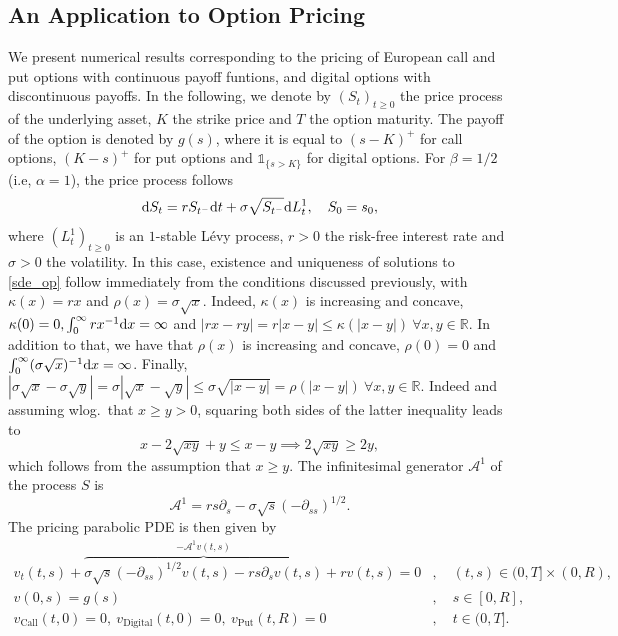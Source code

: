 \subsection{An Application to Option Pricing}
We present numerical results corresponding to the pricing of European call and put options with continuous payoff funtions, and digital options with discontinuous payoffs. In the following, we denote by $(S_t)_{t\ge0}$ the price process of the underlying asset, $K$ the strike price and $T$ the option maturity. The payoff of the option is denoted by $g(s)$, where it is equal to $(s-K)^+$ for call options, $(K-s)^+$ for put options and $\mathbb{1}_{\{s>K\}}$ for digital options. For $\beta = 1/2$ (i.e, $\alpha=1$), the price process follows
\begin{equation} \label{sde_op}
\text{d} S_t = rS_{t^{-}}\text{d} t + \sigma\sqrt{S_{t^{-}}}\text{d} L_t^{1},\quad S_0=s_0, 
\end{equation} 
where $(L_t^{1})_{t\ge 0}$ is an $1$-stable L\'{e}vy process, $r>0$ the risk-free interest rate and $\sigma>0$ the volatility. In this case, existence and uniqueness of solutions to \eqref{sde_op} follow immediately from the conditions discussed previously, with $\kappa(x) = rx$ and $\rho(x) =\sigma \sqrt{x}$. Indeed, $\kappa(x)$ is increasing and concave, $\kappa(0)=0, \int_0^{\infty}rx^{-1}\text{d} x = \infty$ and $|rx-ry| = r|x-y| \le \kappa(|x-y|) \  \forall x,y\in\mathbb{R}.$ In addition to that, we have that $\rho(x)$ is increasing and concave, $\rho(0)=0$ and $\int_0^{\infty}(\sigma\sqrt{x})^{-1}\text{d} x = \infty$. Finally, $|\sigma\sqrt{x}-\sigma\sqrt{y}| = \sigma|\sqrt{x}-\sqrt{y}| \le \sigma \sqrt{|x-y|} = \rho(|x-y|) \ \forall x,y\in\mathbb{R}.$ Indeed and assuming wlog.\ that $x\ge y>0$, squaring both sides of the latter inequality leads to
\begin{equation*}
x-2\sqrt{xy}+y \le x-y \implies 2\sqrt{xy} \ge 2y,
\end{equation*}
which follows from the assumption that $x\ge y.$
The infinitesimal generator $\mathcal{A}^1$ of the process $S$ is 
\begin{equation*}
\mathcal{A}^1 = rs\partial_s - \sigma\sqrt{s}(-\partial_{ss})^{1/2}.
\end{equation*}
The pricing parabolic PDE is then given by 
\begin{equation} \label{pricing_pde}
\begin{split} %
v_t(t,s) + \overbrace{\sigma \sqrt{s}(-\partial_{ss})^{1/2}v(t,s) - rs\partial_sv(t,s)}^{-\mathcal{A}^1v(t,s)} + rv(t,s) = 0&, \quad  (t,s)\in(0,T]\times (0,R), \\
v(0,s) = g(s)&, \quad s\in [0,R], \\ 
v_{\text{Call}}(t,0)=0,\ v_{\text{Digital}}(t,0)=0,\ v_{\text{Put}}(t,R) = 0&, \quad t \in (0,T].
\end{split}
\end{equation}
